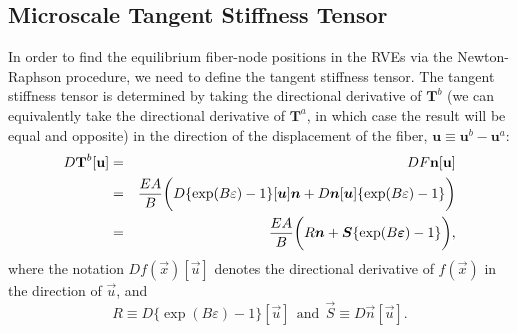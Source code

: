 \subsection{Microscale Tangent Stiffness Tensor}
\label{subsec:tangent_stiffness_tensor}

In order to find the equilibrium fiber-node positions in the RVEs via the Newton-Raphson procedure, we need to define the tangent stiffness tensor. The tangent stiffness tensor is determined by taking the directional derivative of $\textbf{T}^b$ (we can equivalently take the directional derivative of $\textbf{T}^a$, in which case the result will be equal and opposite) in the direction of the displacement of the fiber, $\textbf{u} \equiv \textbf{u}^b - \textbf{u}^a$:
%
\begin{eqnarray}
D\textbf{T}^b [\textbf{u}] &=& D F \textbf{n} [\textbf{u}] \nonumber\\
&=& \frac{E A}{B} \bigg(D \{ \exp(B \varepsilon) - 1\} [\bm{u}] \bm{n}+ D \bm{n} [\bm{u}] \{ \exp(B \varepsilon) - 1\} \bigg) \nonumber\\
&=& \frac{E A}{B} \bigg( R \bm{n} + \bm{S}\{\exp(B \bm{\varepsilon}) - 1\} \bigg),
\label{DT_i}
\end{eqnarray}
%
where the notation $D f(\vec{x}) [\vec{u}]$ denotes the directional derivative of $f(\vec{x})$ in the direction of $\vec{u}$, and 
% 
\begin{equation}
R \equiv D \{ \exp(B \varepsilon) - 1\} [\vec{u}] \ \ \text{and} \ \
\vec{S} \equiv D \vec{n} [\vec{u}].
\end{equation}
%

